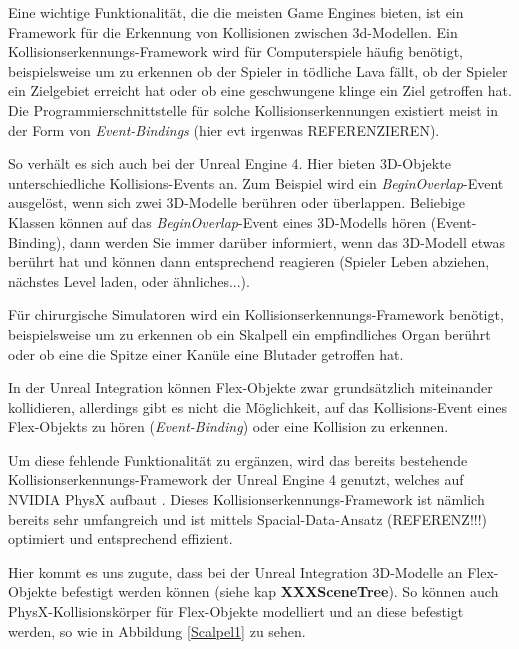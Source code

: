 Eine wichtige Funktionalität, die die meisten Game Engines bieten, ist ein Framework für die Erkennung von Kollisionen zwischen 3d-Modellen. 
Ein Kollisionserkennungs-Framework wird für Computerspiele häufig benötigt, beispielsweise um zu erkennen ob der Spieler in tödliche Lava fällt, ob der Spieler ein Zielgebiet erreicht hat oder ob eine geschwungene klinge ein Ziel getroffen hat. Die Programmierschnittstelle für solche Kollisionserkennungen existiert meist in der Form von \textit{Event-Bindings} (hier evt irgenwas REFERENZIEREN). 

So verhält es sich auch bei der Unreal Engine 4. Hier bieten 3D-Objekte unterschiedliche Kollisions-Events an. Zum Beispiel wird ein \textit{BeginOverlap}-Event ausgelöst, wenn sich zwei 3D-Modelle berühren oder überlappen. Beliebige Klassen können auf das \textit{BeginOverlap}-Event eines 3D-Modells hören (Event-Binding), dann werden Sie immer darüber informiert, wenn das 3D-Modell etwas berührt hat und können dann entsprechend reagieren (Spieler Leben abziehen, nächstes Level laden, oder ähnliches...).

Für chirurgische Simulatoren wird ein Kollisionserkennungs-Framework benötigt, beispielsweise um zu erkennen ob ein Skalpell ein empfindliches Organ berührt oder ob eine die Spitze einer Kanüle eine Blutader getroffen hat.

In der Unreal Integration können Flex-Objekte zwar grundsätzlich miteinander kollidieren, allerdings gibt es nicht die Möglichkeit, auf das Kollisions-Event eines Flex-Objekts zu hören (\textit{Event-Binding}) oder eine Kollision zu erkennen.

Um diese fehlende Funktionalität zu ergänzen, wird das bereits bestehende Kollisionserkennungs-Framework der Unreal Engine 4 genutzt, welches auf NVIDIA PhysX aufbaut \cite{ue4physics}. Dieses Kollisionserkennungs-Framework ist nämlich bereits sehr umfangreich und ist mittels Spacial-Data-Ansatz (REFERENZ!!!) optimiert und entsprechend effizient.


Hier kommt es uns zugute, dass bei der Unreal Integration 3D-Modelle an Flex-Objekte befestigt werden können (siehe kap \textbf{XXXSceneTree}). So können auch PhysX-Kollisionskörper für Flex-Objekte modelliert und an diese befestigt werden, so wie in Abbildung \ref{Scalpel1} zu sehen.

